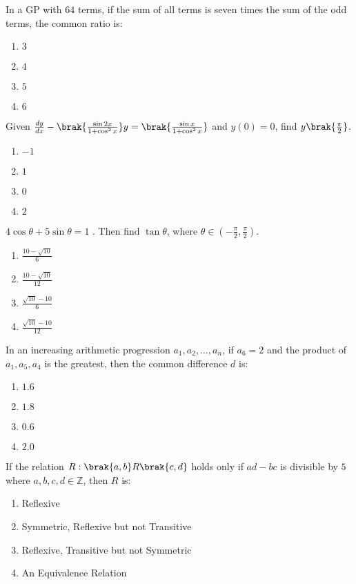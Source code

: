 \item In a GP with $64$ terms, if the sum of all terms is seven times the sum of the odd terms, the common ratio is:
\hfill{}
	\begin{enumerate}
    \item $3$
    \item $4$
    \item $5$
    \item $6$
\end{enumerate}
\item Given $\frac{dy}{dx} -\brak{ \frac{\sin 2x}{1 + \cos^2 x}}y=\brak{\frac{\sin x}{1+\cos^2x}}$ and $y(0) = 0$, find $y \brak{ \frac{\pi}{2}}$.
\hfill{}
	\begin{enumerate}
    \item $-1$
    \item $1$
    \item $0$
    \item $2$
\end{enumerate}
\item  $4 \cos \theta + 5 \sin \theta = 1$ . Then find $\tan \theta$, where $\theta \in \left( -\frac{\pi}{2}, \frac{\pi}{2} \right)$.
\hfill{}
	\begin{enumerate}
    \item $ \frac{10-\sqrt{10}}{6}$
        \item $ \frac{10-\sqrt{10}}{12}$
    \item $ \frac{\sqrt{10}-10}{6}$
     \item $ \frac{\sqrt{10}-10}{12}$
\end{enumerate}
\item In an increasing arithmetic progression $a_1, a_2, \dots, a_n$, if $a_6 = 2$ and the product of $a_1, a_5, a_4$ is the greatest, then the common difference $d$ is:
\hfill{}
	\begin{enumerate}
    \item $1.6$
    \item $1.8$
    \item $0.6$
    \item $2.0$
\end{enumerate}
\item If the relation $R: \brak{a,b} R\brak{c,d}$ holds only if $ad - bc$ is divisible by $5$ where $a,b,c,d \in \mathbb{Z}$, then $R$ is:
\hfill{}
	\begin{enumerate}
    \item Reflexive
    \item Symmetric, Reflexive but not Transitive
    \item Reflexive, Transitive but not Symmetric
    \item An Equivalence Relation
\end{enumerate}

